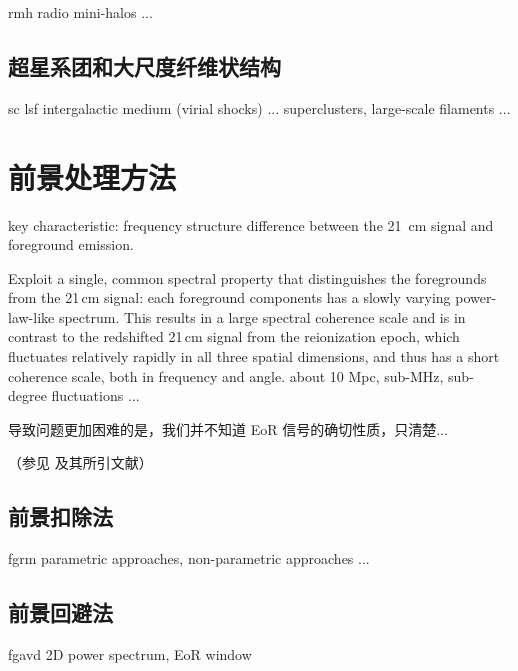 \acl{rmh}
radio mini-halos ...

\subsection{超星系团和大尺度纤维状结构}

\acl{sc}
\acl{lsf}
intergalactic medium (virial shocks) ...
superclusters, large-scale filaments ...


\section{前景处理方法}
\label{sec:fg-methods}

key characteristic: frequency structure difference between
the 21~cm signal and foreground emission.

Exploit a single, common spectral property that distinguishes the
foregrounds from the 21\,cm signal: each foreground components has
a slowly varying power-law-like spectrum.
This results in a large spectral coherence scale and is in contrast
to the redshifted 21\,cm signal from the reionization epoch, which
fluctuates relatively rapidly in all three spatial dimensions, and
thus has a short coherence scale, both in frequency and angle.
about 10 Mpc, sub-MHz, sub-degree fluctuations ...
\cite{morales2004,bowman2009}

导致问题更加困难的是，我们并不知道 EoR 信号的确切性质，只清楚...

（参见  及其所引文献）

\subsection{前景扣除法}
\label{sec:fgrm}

\acl{fgrm}
parametric approaches, non-parametric approaches ...

\subsection{前景回避法}
\label{sec:fgavd}

\acl{fgavd}
2D power spectrum, EoR window


